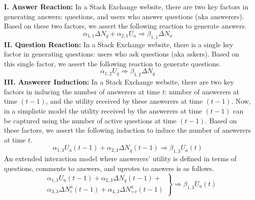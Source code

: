 \textbf{I. Answer Reaction:} In a Stack Exchange website, there are two key factors in generating answers: questions,  and users who answer questions (aka answerers). Based on these two factors, we assert the following reaction to generate answers. 
\begin{equation*}
\alpha_{1, 1} \Delta N_q + \alpha_{2, 1} U_a \Longrightarrow \beta_{1, 1} \Delta N_a
\end{equation*}
\indent \textbf{II. Question Reaction:} In a Stack Exchange website, there is a single key factor in generating questions: users who ask questions (aka askers). Based on this single factor, we assert the following reaction to generate questions.
\begin{equation*}
\alpha_{1, 2} U_q \Longrightarrow \beta_{1, 2} \Delta N_q
\end{equation*}
\indent \textbf{III. Answerer Induction:} In a Stack Exchange website, there are two key factors in inducing the number of answerers at time $t$: number of answerers at time $(t-1)$, 
and the utility received by these answerers at time $(t-1)$. Now, in a simplistic model the utility received by the answerers at time $(t-1)$ can be captured using the number of active questions at time $(t-1)$. Based on these factors, we assert the following induction to induce the number of answerers at time $t$.
\begin{equation*}
\alpha_{1, 3} U_a(t-1) + \alpha_{2, 3} \Delta N_q(t-1) \Longrightarrow \beta_{1, 3} U_a(t)
\end{equation*}
\noindent An extended interaction model where answerers' utility is defined in terms of questions, comments to answers, and upvotes to answers is as follows.
\begin{equation*}
\left.
\begin{aligned}
& \alpha_{1, 3} U_a(t-1) + \alpha_{2, 3} \Delta N_q(t-1) +\\
& \alpha_{3, 3} \Delta N_c^a(t-1) + \alpha_{4, 3} \Delta N_{+v}^a(t-1)
\end{aligned}
\right\}
\Longrightarrow \beta_{1, 3} U_a(t)
\end{equation*}
